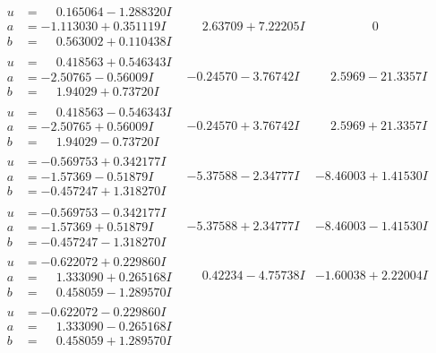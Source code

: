 \documentclass[1p]{elsarticle_modified}
\theoremstyle{definition}
\begin{document}
$$\begin{array}{c|c|c}
\begin{aligned}
u &= \phantom{-}0.165064 - 1.288320 I \\
a &= -1.113030 + 0.351119 I \\
b &= \phantom{-}0.563002 + 0.110438 I\end{aligned}
 & \phantom{-}2.63709 + 7.22205 I & \phantom{-0.000000 } 0 \\ \hline\begin{aligned}
u &= \phantom{-}0.418563 + 0.546343 I \\
a &= -2.50765 - 0.56009 I \\
b &= \phantom{-}1.94029 + 0.73720 I\end{aligned}
 & -0.24570 - 3.76742 I & \phantom{-}2.5969 - 21.3357 I \\ \hline\begin{aligned}
u &= \phantom{-}0.418563 - 0.546343 I \\
a &= -2.50765 + 0.56009 I \\
b &= \phantom{-}1.94029 - 0.73720 I\end{aligned}
 & -0.24570 + 3.76742 I & \phantom{-}2.5969 + 21.3357 I \\ \hline\begin{aligned}
u &= -0.569753 + 0.342177 I \\
a &= -1.57369 - 0.51879 I \\
b &= -0.457247 + 1.318270 I\end{aligned}
 & -5.37588 - 2.34777 I & -8.46003 + 1.41530 I \\ \hline\begin{aligned}
u &= -0.569753 - 0.342177 I \\
a &= -1.57369 + 0.51879 I \\
b &= -0.457247 - 1.318270 I\end{aligned}
 & -5.37588 + 2.34777 I & -8.46003 - 1.41530 I \\ \hline\begin{aligned}
u &= -0.622072 + 0.229860 I \\
a &= \phantom{-}1.333090 + 0.265168 I \\
b &= \phantom{-}0.458059 - 1.289570 I\end{aligned}
 & \phantom{-}0.42234 - 4.75738 I & -1.60038 + 2.22004 I \\ \hline\begin{aligned}
u &= -0.622072 - 0.229860 I \\
a &= \phantom{-}1.333090 - 0.265168 I \\
b &= \phantom{-}0.458059 + 1.289570 I\end{aligned}

\end{array}$$
\end{document}
